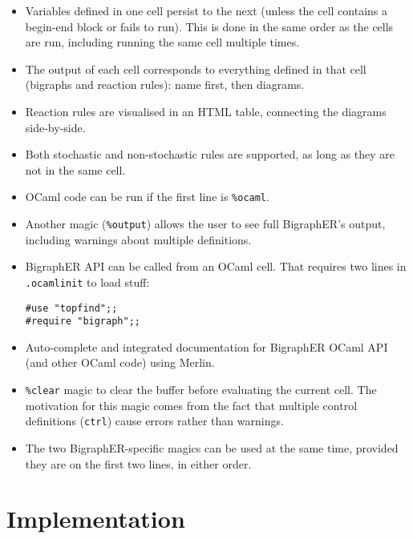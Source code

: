 \documentclass{article}
\begin{document}
\begin{itemize}
\item Variables defined in one cell persist to the next (unless the cell
  contains a begin-end block or fails to run). This is done in the same order as
  the cells are run, including running the same cell multiple times.
\item The output of each cell corresponds to everything defined in that cell
  (bigraphs and reaction rules): name first, then diagrams.
\item Reaction rules are visualised in an HTML table, connecting the diagrams
  side-by-side.
\item Both stochastic and non-stochastic rules are supported, as long as they
  are not in the same cell.
\item OCaml code can be run if the first line is \texttt{\%ocaml}.
\item Another magic (\texttt{\%output}) allows the user to see full BigraphER's
  output, including warnings about multiple definitions.
\item BigraphER API can be called from an OCaml cell. That requires two lines in
  \texttt{.ocamlinit} to load stuff:
  \begin{lstlisting}
#use "topfind";;
#require "bigraph";;
  \end{lstlisting}
\item Auto-complete and integrated documentation for BigraphER OCaml API (and
  other OCaml code) using Merlin.
\item \texttt{\%clear} magic to clear the buffer before evaluating the current
  cell. The motivation for this magic comes from the fact that multiple
  control definitions (\texttt{ctrl}) cause errors rather than warnings.
\item The two BigraphER-specific magics can be used at the same time, provided
  they are on the first two lines, in either order.
\end{itemize}

\section{Implementation}
\end{document}
